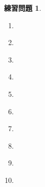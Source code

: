 \documentclass[uplatex]{jsarticle}
\theoremstyle{definition}
\newtheorem{prob}[prob]{練習問題}
\begin{document}
\begin{prob}\label{prob: 9.6}
  \begin{enumerate}
    \item \label{enumi: 9.6-1}
    \item \label{enumi: 9.6-2}
    \item \label{enumi: 9.6-3}
    \item \label{enumi: 9.6-4}
    \item \label{enumi: 9.6-5}
    \item \label{enumi: 9.6-6}
    \item \label{enumi: 9.6-7}
    \item \label{enumi: 9.6-8}
    \item \label{enumi: 9.6-9}
    \item \label{enumi: 9.6-10}
  \end{enumerate}
\end{prob}
\end{document}
